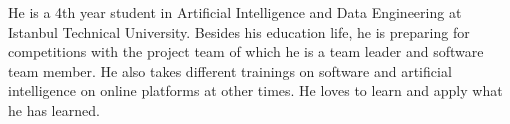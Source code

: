 

\begin{cvparagraph}

He is a 4th year student in Artificial Intelligence and Data Engineering at Istanbul Technical University. Besides his education life, he is preparing for competitions with the project team of which he is a team leader and software team member. He also takes different trainings on software and artificial intelligence on online platforms at other times. He loves to learn and apply what he has learned.
\end{cvparagraph}